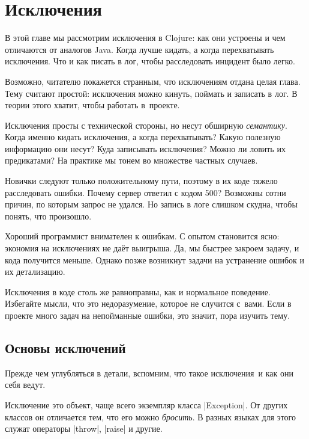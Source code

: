 \chapter{Исключения}


\begin{teaser}
В этой главе мы рассмотрим исключения в Clojure: как они устроены и чем
отличаются от аналогов Java. Когда лучше кидать, а когда перехватывать
исключения. Что и как писать в лог, чтобы расследовать инцидент было легко.
\end{teaser}

Возможно, читателю покажется странным, что исключениям отдана целая глава. Тему
считают простой: исключения можно кинуть, поймать и записать в лог. В теории
этого хватит, чтобы работать в~проекте.

Исключения просты с технической стороны, но несут обширную
\emph{семантику}. Когда именно кидать исключения, а когда перехватывать?  Какую
полезную информацию они несут? Куда записывать исключения? Можно ли ловить их
предикатами? На практике мы тонем во множестве частных случаев.

Новички следуют только положительному пути, поэтому в их коде тяжело
расследовать ошибки. Почему сервер ответил с кодом 500? Возможны сотни причин,
по которым запрос не удался. Но запись в логе слишком скудна, чтобы понять, что
произошло.

Хороший программист внимателен к ошибкам. С опытом становится ясно: экономия на
исключениях не да\"{е}т выигрыша. Да, мы быстрее закроем задачу, и кода
получится меньше. Однако позже возникнут задачи на устранение ошибок и их
детализацию.

Исключения в коде столь же равноправны, как и нормальное поведение. Избегайте
мысли, что это недоразумение, которое не случится с~вами. Если в проекте много
задач на непойманные ошибки, это значит, пора изучить тему.

\section{Основы исключений}

Прежде чем углубляться в детали, вспомним, что такое исключения~и как они себя
ведут.


Исключение это объект, чаще всего экземпляр класса \spverb|Exception|. От других
классов он отличается тем, что его можно \emph{бросить}. В разных языках для
этого служат операторы \spverb|throw|, \spverb|raise| и другие.

